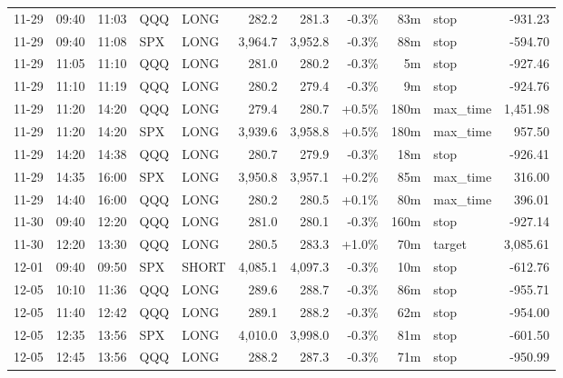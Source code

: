 \documentclass[11pt,a4paper,twoside]{article}
\begin{document}
\begin{center}
\begin{longtable}{>{\color{txtmain}}l l l l l r r r r >{\color{txtmain}}l r}
11-29 & 09:40 & 11:03 & QQQ & LONG & 282.2 & 281.3 & \textcolor{lossred}{-0.3\%} & 83m & stop & \textcolor{lossred}{-931.23} \\
11-29 & 09:40 & 11:08 & SPX & LONG & 3,964.7 & 3,952.8 & \textcolor{lossred}{-0.3\%} & 88m & stop & \textcolor{lossred}{-594.70} \\
11-29 & 11:05 & 11:10 & QQQ & LONG & 281.0 & 280.2 & \textcolor{lossred}{-0.3\%} & 5m & stop & \textcolor{lossred}{-927.46} \\
11-29 & 11:10 & 11:19 & QQQ & LONG & 280.2 & 279.4 & \textcolor{lossred}{-0.3\%} & 9m & stop & \textcolor{lossred}{-924.76} \\
11-29 & 11:20 & 14:20 & QQQ & LONG & 279.4 & 280.7 & \textcolor{wingreen}{+0.5\%} & 180m & max\_time & \textcolor{wingreen}{1,451.98} \\
11-29 & 11:20 & 14:20 & SPX & LONG & 3,939.6 & 3,958.8 & \textcolor{wingreen}{+0.5\%} & 180m & max\_time & \textcolor{wingreen}{957.50} \\
11-29 & 14:20 & 14:38 & QQQ & LONG & 280.7 & 279.9 & \textcolor{lossred}{-0.3\%} & 18m & stop & \textcolor{lossred}{-926.41} \\
11-29 & 14:35 & 16:00 & SPX & LONG & 3,950.8 & 3,957.1 & \textcolor{wingreen}{+0.2\%} & 85m & max\_time & \textcolor{wingreen}{316.00} \\
11-29 & 14:40 & 16:00 & QQQ & LONG & 280.2 & 280.5 & \textcolor{wingreen}{+0.1\%} & 80m & max\_time & \textcolor{wingreen}{396.01} \\
11-30 & 09:40 & 12:20 & QQQ & LONG & 281.0 & 280.1 & \textcolor{lossred}{-0.3\%} & 160m & stop & \textcolor{lossred}{-927.14} \\
11-30 & 12:20 & 13:30 & QQQ & LONG & 280.5 & 283.3 & \textcolor{wingreen}{+1.0\%} & 70m & target & \textcolor{wingreen}{3,085.61} \\
12-01 & 09:40 & 09:50 & SPX & SHORT & 4,085.1 & 4,097.3 & \textcolor{lossred}{-0.3\%} & 10m & stop & \textcolor{lossred}{-612.76} \\
12-05 & 10:10 & 11:36 & QQQ & LONG & 289.6 & 288.7 & \textcolor{lossred}{-0.3\%} & 86m & stop & \textcolor{lossred}{-955.71} \\
12-05 & 11:40 & 12:42 & QQQ & LONG & 289.1 & 288.2 & \textcolor{lossred}{-0.3\%} & 62m & stop & \textcolor{lossred}{-954.00} \\
12-05 & 12:35 & 13:56 & SPX & LONG & 4,010.0 & 3,998.0 & \textcolor{lossred}{-0.3\%} & 81m & stop & \textcolor{lossred}{-601.50} \\
12-05 & 12:45 & 13:56 & QQQ & LONG & 288.2 & 287.3 & \textcolor{lossred}{-0.3\%} & 71m & stop & \textcolor{lossred}{-950.99} \\

\end{longtable}
\end{center}
\end{document}

